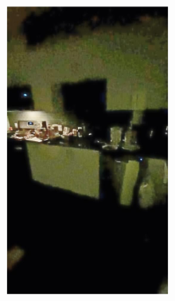 \documentclass[letterpaper,12pt]{article}
\begin{document}
\begin{figure}[htbp]
\begin{subfigure}{0.128\textwidth}
			\includegraphics[width=\linewidth]{LoLi-Phone-imgT/LLNet}
			\captionsetup{font=scriptsize}
			\caption{}
			\label{fig: LoLi-Phone-imgT_b}
		\end{subfigure}
		\begin{subfigure}{0.128\textwidth}

\end{subfigure}
\end{figure}
\end{document}
